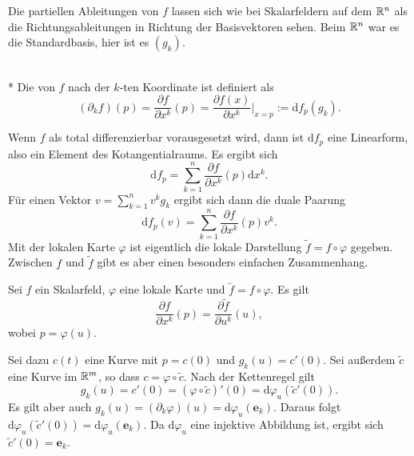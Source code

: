 Die partiellen Ableitungen von $f$ lassen sich wie bei Skalarfeldern
auf dem $\mathbb R^n$ als die Richtungsableitungen in Richtung der
Basisvektoren sehen. Beim $\mathbb R^n$ war es die Standardbasis, hier ist
es $(g_k)$.
\begin{definition}\mbox{}\\*
Die  von $f$ nach der $k$-ten Koordinate
ist definiert als
\begin{equation}
(\partial_k f)(p) = \frac{\partial f}{\partial x^k}(p)
= \frac{\partial f(x)}{\partial x^k}\Big|_{x=p} :=
\mathrm df_p(g_k).
\end{equation}
\end{definition}
Wenn $f$ als total differenzierbar vorausgesetzt wird, dann ist
$\mathrm df_p$ eine Linearform, also ein Element des
Kotangentialraums. Es ergibt sich
\begin{equation}
\mathrm df_p = \sum_{k=1}^n \frac{\partial f}{\partial x^k}(p)\mathrm dx^k.
\end{equation}
Für einen Vektor $v=\sum_{k=1}^n v^k g_k$ ergibt
sich dann die duale Paarung
\begin{equation}
\mathrm df_p(v) = \sum_{k=1}^n \frac{\partial f}{\partial x^k}(p)v^k.
\end{equation}
Mit der lokalen Karte $\varphi$ ist eigentlich die lokale
Darstellung $\tilde f=f\circ\varphi$ gegeben. Zwischen
$f$ und $\tilde f$ gibt es aber einen besonders einfachen Zusammenhang.
\begin{corollary}
Sei $f$ ein Skalarfeld, $\varphi$ eine lokale Karte und
$\tilde f=f\circ\varphi$. Es gilt%
\begin{equation}
\frac{\partial f}{\partial x^k}(p) = \frac{\partial\tilde f}{\partial u^k}(u),
\end{equation}
wobei $p=\varphi(u)$.
\end{corollary}
 Sei dazu $c(t)$ eine Kurve mit $p=c(0)$ und
$g_k(u)=c'(0)$. Sei außerdem $\tilde c$ eine Kurve im $\mathbb R^m$, so dass
$c=\varphi\circ \tilde c$. Nach der Kettenregel gilt
\begin{equation}
g_k(u) = c'(0) = (\varphi\circ\tilde c)'(0) = \mathrm d\varphi_u(\tilde c'(0)).
\end{equation}
Es gilt aber auch $g_k(u) = (\partial_k\varphi)(u) =
\mathrm d\varphi_u(\mathbf e_k)$. Daraus folgt
$\mathrm d\varphi_u(\tilde c'(0)) = \mathrm d\varphi_u(\mathbf e_k)$.
Da $\mathrm d\varphi_u$ eine injektive Abbildung ist, ergibt sich
$\tilde c'(0) = \mathbf e_k$.\;\qedsymbol


